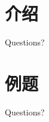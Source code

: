 \section{介绍}



\begin{frame}[standout]
	Questions?
\end{frame}


\section{例题}



\begin{frame}[standout]
	Questions?
\end{frame}
